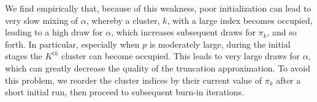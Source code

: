 We find empirically that, because of this weakness, poor initialization can
lead to very slow mixing of $\alpha$, whereby a cluster, $k$, with a large
index becomes occupied, leading to a high draw for $\alpha$, which
increases subsequent draws for $\pi_k$, and so forth. In particular,
especially when $p$ is moderately large, during the initial stages the
$K^{th}$ cluster can become occupied. This leads to very large draws
for $\alpha$, which can greatly decrease the quality of the truncation
approximation. To avoid this problem, we reorder the cluster indices by their current value of $\pi_k$ after a short initial run, then proceed to subsequent burn-in iterations. 



